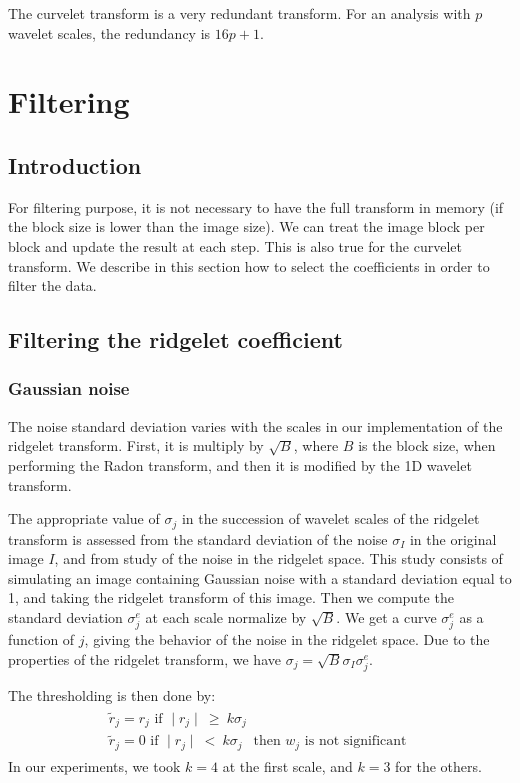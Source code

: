 \documentclass{article}
\begin{document}
The curvelet transform is a very redundant transform. For an analysis 
with $p$ wavelet scales, the redundancy is $16p+1$. 

\section{Filtering}
\subsection{Introduction}
For filtering purpose, it is not necessary to have the full transform
in memory (if the block size is lower than the image size). We can
treat the image block per block and update the result at each step.
This is also true for the curvelet transform. We describe in this section
how to select the coefficients in order to filter the data.

\subsection{Filtering the ridgelet coefficient}

\subsubsection{Gaussian noise}
The noise standard deviation varies with the scales in our 
implementation of the ridgelet transform. First, it is multiply
by $\sqrt{B}$, where $B$ is the block size, when performing the Radon
transform, and then it is modified by the 1D wavelet transform.

The appropriate value of $\sigma_j$ 
in the succession of wavelet scales of the ridgelet transform is assessed 
from the standard deviation of the noise $\sigma_I$ in the original image
$I$, and from study of the noise in the ridgelet space.  This study consists of 
simulating an image containing Gaussian noise with a standard deviation 
equal to 1, and taking the ridgelet transform of this image.  Then we
compute the standard deviation $\sigma^e_j$ at each scale normalize
by  $\sqrt{B}$.  We get a curve 
$\sigma^e_j$ as a function of $j$, giving the behavior of the noise in the 
ridgelet space.  Due to the properties of the ridgelet transform, we have 
$ \sigma_j = \sqrt{B} \sigma_I \sigma^e_j $.

The thresholding is then done by:
\begin{eqnarray}
\begin{array}{l}
\tilde r_j = r_j \mbox{ if }  \mid r_j \mid \ \geq \ k \sigma_j \\ 
\tilde r_j = 0 \mbox{ if }  \mid r_j \mid \ < \ k \sigma_j \ \ \mbox{ then } w_j \mbox{ is not significant }
\end{array}
\end{eqnarray}
In our experiments, we took $k=4$ at the first scale,  and $k=3$
for the others.
\end{document}
